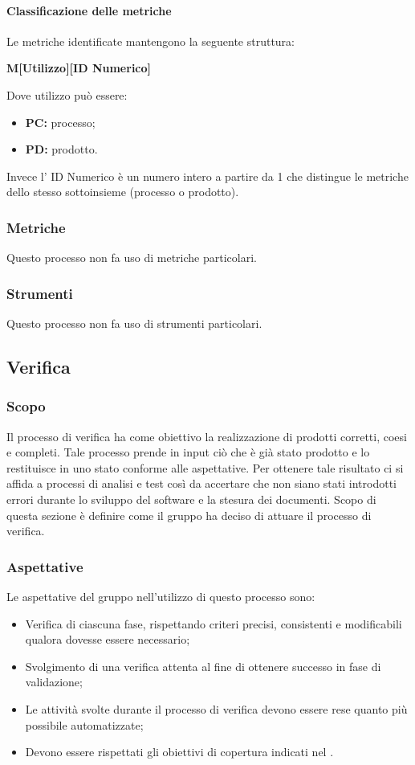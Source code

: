 \paragraph{Classificazione delle metriche}
Le metriche identificate mantengono la seguente struttura:
\begin {center}
    \large{\textbf{M[Utilizzo][ID Numerico]}}
\end{center}
Dove utilizzo può essere:
\begin{itemize}
    \item \textbf{PC:} processo;
    \item \textbf{PD:} prodotto.
\end{itemize}
Invece l' ID Numerico è un numero intero a partire da 1 che distingue le metriche dello stesso sottoinsieme (processo o prodotto).   
\subsubsection{Metriche}
Questo processo non fa uso di metriche particolari.
\subsubsection{Strumenti}
Questo processo non fa uso di strumenti particolari.

\vspace{2cm}

\subsection{Verifica} \label{subsection: Verifica}
\subsubsection{Scopo}
Il processo di verifica ha come obiettivo la realizzazione di prodotti corretti, coesi e completi. Tale processo prende in input ciò che è già stato prodotto e lo restituisce in uno stato conforme alle aspettative. Per ottenere tale risultato ci si affida a processi di analisi e test così da accertare che non siano stati introdotti errori durante lo sviluppo del software e la stesura dei documenti. Scopo di questa sezione è definire come il gruppo ha deciso di attuare il processo di verifica.

\subsubsection{Aspettative}
Le aspettative del gruppo \groupName{} nell'utilizzo di questo processo sono:
\begin{itemize}
    \item Verifica di ciascuna fase, rispettando criteri precisi, consistenti e modificabili qualora dovesse essere necessario;
    \item Svolgimento di una verifica attenta al fine di ottenere successo in fase di validazione;
    \item Le attività svolte durante il processo di verifica devono essere rese quanto più possibile automatizzate;
    \item Devono essere rispettati gli obiettivi di copertura indicati nel \docNamePdQLow{}.
\end{itemize}

